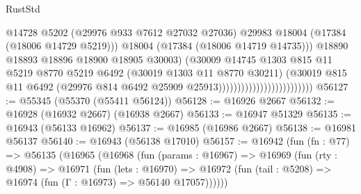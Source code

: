 \begin{lexlean}{RustStd}
\begin{coremodule}
                                                      @14728
                                                      @5202
                                                      (@29976 @933 @7612 @27032 @27036)
                                                      @29983
                                                      @18004
                                                      (@17384 (@18006 @14729 @5219)))
                                                    @18004
                                                    (@17384 (@18006 @14719 @14735)))
                                                  @18890
                                                  @18893
                                                  @18896
                                                  @18900
                                                  @18905
                                                  @30003)
                                                (@30009
                                                  @14745
                                                  @1303
                                                  @815
                                                  @11
                                                  @5219
                                                  @8770
                                                  @5219
                                                  @6492
                                                  (@30019 @1303 @11 @8770 @30211)
                                                  (@30019
                                                    @815
                                                    @11
                                                    @6492
                                                    (@29976
                                                      @814
                                                      @6492
                                                      @25909
                                                      @25913)))))))))))))))))))))))))
@56127 := @55345 (@55370 (@55411 @56124))
@56128 := @16926 @2667
@56132 := @16928 (@16932 @2667) (@16938 @2667)
@56133 := @16947 @51329
@56135 := @16943 (@56133 @16962)
@56137 := @16985 (@16986 @2667)
@56138 := @16981 @56137
@56140 := @16943 (@56138 @17010)
@56157 := @16942
    (fun (fn : @77) =>
    @56135
      (@16965
        (@16968
          (fun (params : @16967) =>
          @16969
            (fun (rty : @4908) =>
            @16971
              (fun (lets : @16970) =>
              @16972 (fun (tail : @5208) => @16974 (fun (Γ : @16973) => @56140 @17057))))))

\end{coremodule}
\end{lexlean}
